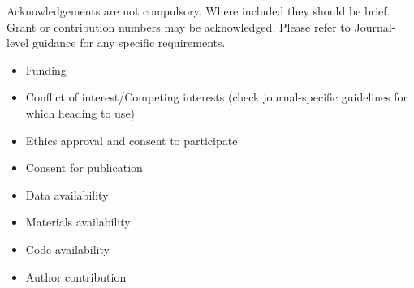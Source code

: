 \documentclass[pdflatex, sn-mathphys-num, lineno]{sn-jnl}%
\theoremstyle{thmstyleone}%
\theoremstyle{thmstyletwo}%
\theoremstyle{thmstylethree}%
\begin{document}

Acknowledgements are not compulsory. Where included they should be brief. Grant or contribution numbers may be acknowledged.
Please refer to Journal-level guidance for any specific requirements.



\begin{itemize}
	\item Funding
	\item Conflict of interest/Competing interests (check journal-specific guidelines for which heading to use)
	\item Ethics approval and consent to participate
	\item Consent for publication
	\item Data availability
	\item Materials availability
	\item Code availability
	\item Author contribution
\end{itemize}
\end{document}

